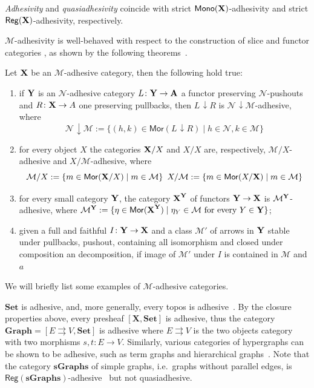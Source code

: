 \documentclass[runningheads,envcountsect]{llncs}
\newcommand{\cat}[1]{\ensuremath{\mathbf{#1}}}
\def\X{\textbf {\textup{X}}}
\def\Y{\textbf {\textup{Y}}}
\def\A{\textbf {\textup{A}}}
\newcommand{\comma}[2]{#1\hspace{1pt} {\downarrow}#2}
\newcommand{\mor}{\mathsf{Mor}}
\newcommand{\mon}{\mathsf{Mono}}
\newcommand{\reg}{\mathsf{Reg}}
\begin{document}
\begin{remark}
	\label{rem:salva}
	\emph{Adhesivity} and \emph{quasiadhesivity} 
	\cite{lack2005adhesive,garner2012axioms} coincide with strict
	$\mon(\X) $-adhesivity and strict $\reg(\X)$-adhesivity,
	respectively.
\end{remark}


$\mathcal{M}$-adhesivity is well-behaved with respect to  the construction of slice and functor categories \cite{mac2013categories}, as shown by the following theorems~\cite{ehrig2006fundamentals,lack2005adhesive}.

\begin{theorem}
	\label{thm:slice-functors}
	Let $\X$ be an $\mathcal{M}$-adhesive category, then the following hold true:
	\begin{enumerate}
		\item if $\Y$ is an $\mathcal{N}$-adhesive category $L\colon \Y\to \A$ a functor preserving $\mathcal{N}$-pushouts and $R\colon \X\to A$ one preserving pullbacks, then $\comma{L}{R}$ is $\comma{\mathcal{N}}{\mathcal{M}}$-adhesive, where
		\[\comma{\mathcal{N}}{\mathcal{M}}:=\{(h,k) \in \mor(\comma{L}{R}) \mid h\in \mathcal{N}, k\in \mathcal{M}\}\]
		\item for every object $X$
		the categories $\X/X$  and $X/X$ are, respectively, $\mathcal{M}/X$-adhesive and $X/\mathcal{M}$-adhesive, where
		\[\mathcal{M}/X:=\{m\in \mor(\X/X) \mid m\in
		\mathcal{M}\} \hspace{5pt} X/\mathcal{M}:=\{m\in \mor(X/\X) \mid m\in \mathcal{M}\}\]
		\item for every small category $\Y$, the category $\X^\Y$ of
		functors $\Y\to \X$ is $\mathcal{M}^{\Y}$-adhesive, where
		$\mathcal{M}^{\Y}:=\{\eta \in \mor(\X^\Y) \mid \eta_Y \in
		\mathcal{M} \text{ for every } Y\in \Y\}$;
		\item given a  full and faithful $I\colon \Y\to \X$ and a class $\mathcal{M}'$ of arrows in $\Y$ stable under pullbacks, pushout, containing all isomorphism and closed under composition an decomposition, if image of $\mathcal{M}'$ under $I$ is contained in $\mathcal{M}$ and $a$
	\end{enumerate} 
\end{theorem}

We will briefly list some examples of $\mathcal{M}$-adhesive categories.


\begin{example}
	\label{ex:adhesive}
	$\cat{Set}$ is adhesive, and, more generally, every topos is
	adhesive~\cite{lack2006toposes}. By the closure properties above, every presheaf $[\cat{X},\cat{Set}]$ is adhesive, thus the category
	$\cat{Graph} = [ E \rightrightarrows V, \cat{Set}]$ is adhesive
	where $E \rightrightarrows {V}$ is the two objects category with two
	morphisms $s,t \colon{E} \to {V}$. Similarly, various
	categories of hypergraphs can be shown to be adhesive, such as term
	graphs and hierarchical graphs~\cite{CastelnovoGM24}. Note that the category $\cat{sGraphs}$ of simple graphs, 
	i.e.~graphs without parallel edges, is
	$\reg{(\cat{sGraphs})}$-adhesive~\cite{BehrHK23} but not
	quasiadhesive.
\end{example}
\end{document}
